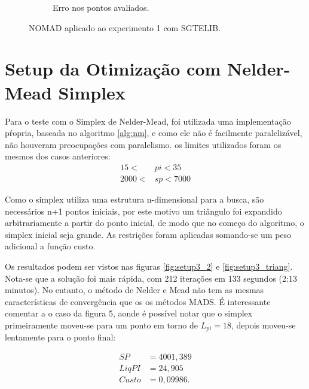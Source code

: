 \begin{figure}
\begin{subfigure}{0.5\textwidth}
  \caption{Erro nos pontos avaliados.}
  \label{fig:setup2_error}
\end{subfigure}
\caption{NOMAD aplicado ao experimento 1 com SGTELIB.}
\label{fig:setup2_2}
\end{figure}


\section{Setup da Otimização com Nelder-Mead Simplex}

Para o teste com o Simplex de Nelder-Mead, foi utilizada uma implementação pŕopria, baseada no algoritmo \ref{alg:nm}, e como ele não é facilmente paralelizável, não houveram preocupações com paralelismo.
os limites utilizados foram os mesmos dos casos anteriores:
\begin{align}
15 < &pi < 35 \\
2000 < &sp < 7000
\end{align}

Como o simplex utiliza uma estrutura n-dimensional para a busca, são necessários n+1 pontos iniciais, por este motivo um triângulo foi expandido arbitrariamente a partir do ponto inicial, de modo que no começo do algoritmo, o simplex inicial seja grande. As restrições foram aplicadas somando-se um peso adicional a função custo.

Os resultados podem ser vistos nas figuras \ref{fig:setup3_2} e \ref{fig:setup3_triang}. Nota-se que a solução foi mais rápida, com 212 iterações em 133 segundos (2:13 minutos). No entanto, o método de Nelder e Mead não tem as mesmas características de convergência que os os métodos MADS. É interessante comentar a o caso da figura 5, aonde é possível notar que o simplex primeiramente moveu-se para um ponto em torno de $L_{pi}=18$, depois moveu-se lentamente para o ponto final:

\begin{align*}
SP&= 4001,389 \\
Liq PI &= 24,905 \\
Custo &= 0,09986.
\end{align*}


